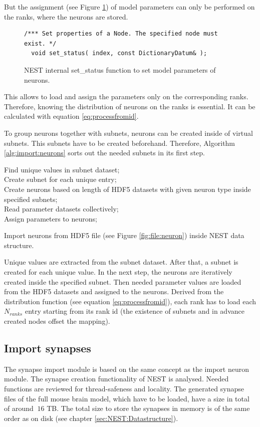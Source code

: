 But the assignment (see Figure \ref{code:setstatus}) of model parameters can only be performed on the ranks,
where the neurons are stored.
\begin{figure}[ht!]
\begin{lstlisting}[style=cppcode]
/*** Set properties of a Node. The specified node must exist. */
  void set_status( index, const DictionaryDatum& );
\end{lstlisting}
\caption{NEST internal set\_{}status function to set model parameters of neurons.}
\label{code:setstatus}
\end{figure}
This allows to load and assign the parameters only on the corresponding ranks.
Therefore, knowing the distribution of neurons on the ranks is essential.
It can be calculated with equation \ref{eq:processfromid}.

To group neurons together with subnets, neurons can be created inside of virtual subnets.
This subnets have to be created beforehand.
Therefore, Algorithm \ref{alg:import:neurons} sorts out the needed subnets in its first step.
\begin{algorithm}[ht!]
 Find unique values in subnet dataset; \\
 Create subnet for each unique entry; \\
 Create neurons based on length of HDF5 datasets with given neuron type inside specified subnets; \\
 Read parameter datasets collectively; \\
 Assign parameters to neurons;\\
 \hspace{0.1cm}
\caption{Import neurons from HDF5 file (see Figure \ref{fig:file:neuron}) inside NEST data structure.}
\label{alg:import:neurons}
\end{algorithm}

Unique values are extracted from the subnet dataset.
After that, a subnet is created for each unique value. 
In the next step, the neurons are iteratively created inside the specified subnet.
Then needed parameter values are loaded from the HDF5 datasets and assigned to the neurons.
Derived from the distribution function (see equation \ref{eq:processfromid}), each rank has to load each $N_{ranks}$
entry starting from its rank id (the existence of subnets and in advance created nodes offset the mapping).

\subsection{Import synapses}
The synapse import module is based on the same concept as the import neuron module.
The synapse creation functionality of NEST is analysed.
Needed functions are reviewed for thread-safeness and locality.
The generated synapse files of the full mouse brain model, which have to be loaded, have a size in total of around $~16$ TB.
The total size to store the synapses in memory is of the same order as on disk (see chapter \ref{sec:NEST:Datastructure}).

